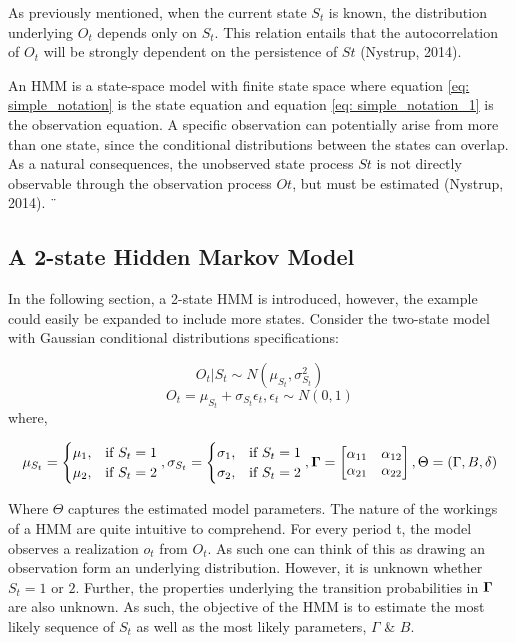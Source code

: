 As previously mentioned, when the current state $S_t$ is known, the distribution underlying $O_t$ depends only on $S_t$. This relation entails that the autocorrelation of {$O_t$} will be strongly dependent on the
persistence of $St$ (Nystrup, 2014).

An HMM is a state-space model with finite state space where equation \ref{eq: simple_notation} is the state equation and equation \ref{eq: simple_notation_1} is the observation equation. A specific observation can potentially arise from more than one state, since the conditional distributions between the states can overlap. As a natural consequences, the unobserved state process $St$ is  not directly observable through the observation process $Ot$, but must be estimated (Nystrup, 2014).
¨
\subsection{A 2-state Hidden Markov Model}
In the following section, a 2-state HMM is introduced, however, the example could easily be expanded to include more states. Consider the two-state model with Gaussian conditional distributions specifications:

\begin{equation}
     O_t|S_t \sim N(\mu_{S_t},\sigma^2_{S_t}) 
\end{equation}
\begin{equation}
   O_t = \mu_{S_t} + \sigma_{S_t}\epsilon_{t}, \epsilon_{t} \sim N(0,1)   
\end{equation}
where,

$$
\mu_{S_t}=
\begin{cases}
    \mu_1, & \text{if}\ S_t = 1 \\
    \mu_2, & \text{if}\ S_t = 2
\end{cases},
\sigma_{S_t} =
\begin{cases}
    \sigma_1, & \text{if}\ S_t = 1 \\
    \sigma_2, & \text{if}\ S_t = 2
\end{cases},
\bold{\Gamma} = 
\begin{bmatrix}
\alpha_{11} & \alpha_{12} \\
\alpha_{21} & \alpha_{22}
\end{bmatrix},
\Theta = (\Gamma, B, \delta)
$$

Where $\Theta$ captures the estimated model parameters. The nature of the workings of a HMM are quite intuitive to comprehend. For every period t, the model observes a realization $o_t$ from $O_t$. As such one can think of this as drawing an observation form an underlying distribution. However, it is unknown whether $S_t = 1$ or $2$. Further, the properties underlying the transition probabilities in $\bold{\Gamma}$ are also unknown. As such, the objective of the HMM is to estimate the most likely sequence of $S_t$ as well as the most likely parameters, $\Gamma$ \& $B$. 

